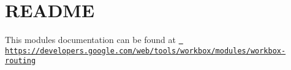 \chapter{README}
\hypertarget{md_pkiclassroomrescheduler_2src_2main_2frontend_2node__modules_2workbox-routing_2_r_e_a_d_m_e}{}\label{md_pkiclassroomrescheduler_2src_2main_2frontend_2node__modules_2workbox-routing_2_r_e_a_d_m_e}
This module\textquotesingle{}s documentation can be found at \href{https://developers.google.com/web/tools/workbox/modules/workbox-routing}{\texttt{ https\+://developers.\+google.\+com/web/tools/workbox/modules/workbox-\/routing}} 